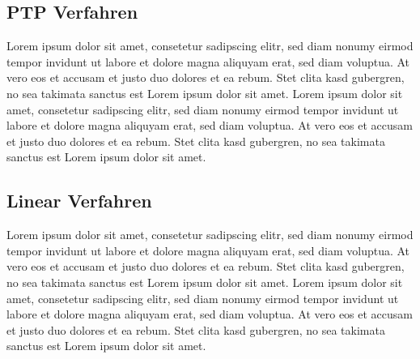 \subsection{PTP Verfahren}
\label{capi_control_loop_gru}
Lorem ipsum dolor sit amet, consetetur sadipscing elitr, sed diam nonumy eirmod tempor invidunt ut labore et dolore magna aliquyam erat, sed diam voluptua. At vero eos et accusam et justo duo dolores et ea rebum. Stet clita kasd gubergren, no sea takimata sanctus est Lorem ipsum dolor sit amet. Lorem ipsum dolor sit amet, consetetur sadipscing elitr, sed diam nonumy eirmod tempor invidunt ut labore et dolore magna aliquyam erat, sed diam voluptua. At vero eos et accusam et justo duo dolores et ea rebum. Stet clita kasd gubergren, no sea takimata sanctus est Lorem ipsum dolor sit amet.

\subsection{Linear Verfahren}
\label{capi_control_loop_gru}
Lorem ipsum dolor sit amet, consetetur sadipscing elitr, sed diam nonumy eirmod tempor invidunt ut labore et dolore magna aliquyam erat, sed diam voluptua. At vero eos et accusam et justo duo dolores et ea rebum. Stet clita kasd gubergren, no sea takimata sanctus est Lorem ipsum dolor sit amet. Lorem ipsum dolor sit amet, consetetur sadipscing elitr, sed diam nonumy eirmod tempor invidunt ut labore et dolore magna aliquyam erat, sed diam voluptua. At vero eos et accusam et justo duo dolores et ea rebum. Stet clita kasd gubergren, no sea takimata sanctus est Lorem ipsum dolor sit amet.
